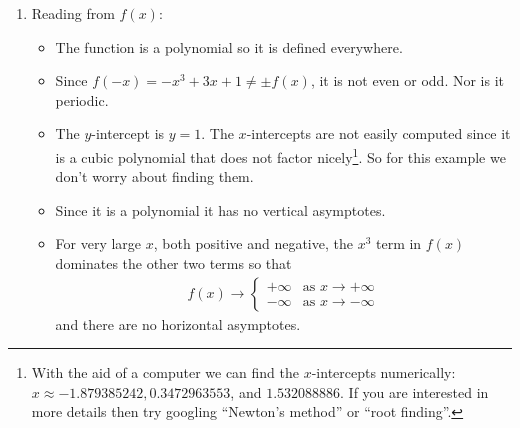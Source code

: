 \begin{eg}[Sketch $f(x)=x^3-3x+1$]\label{APPsketchA}

\begin{enumerate}[(1)]
\item Reading from $f(x)$:
\begin{itemize}
 \item The function is a polynomial so it is defined everywhere.
\item Since $f(-x) = -x^3+3x+1 \neq \pm f(x)$, it is not even or odd. Nor is it periodic.
\item The $y$-intercept is $y=1$. The $x$-intercepts are not easily computed since it is
a cubic polynomial that does not factor nicely\footnote{With the aid of a computer we
can find the $x$-intercepts numerically: $x\approx -1.879385242, 0.3472963553$, and
$1.532088886$. If you are interested in more details then try googling
``Newton's method'' or ``root finding''.}. So for this example we don't worry
about finding them.
\item Since it is a polynomial it has no vertical asymptotes.
\item For very large $x$, both positive and negative,
the $x^3$ term in $f(x)$ dominates the other two terms so that
\begin{align*}
f(x)\rightarrow\begin{cases}+\infty &\text{as }x\rightarrow+\infty \\
                            -\infty &\text{as }x\rightarrow-\infty
                \end{cases}
\end{align*}
and there are no horizontal asymptotes.
\end{itemize}



\end{enumerate}
\end{eg}
